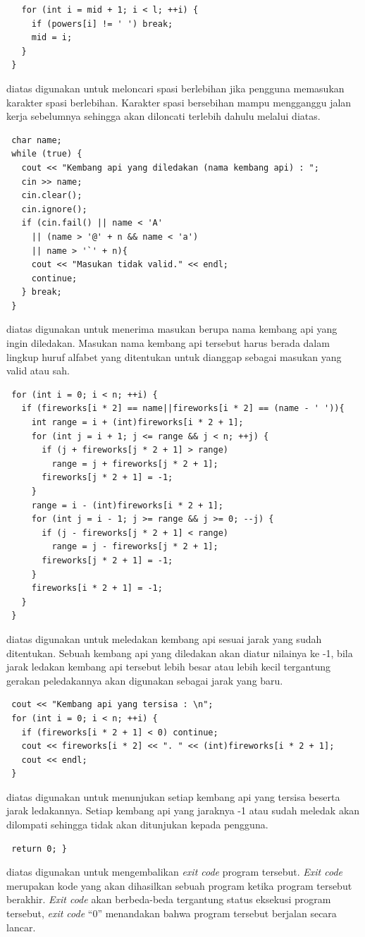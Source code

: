 \documentclass{subfiles}
\begin{document}
\begin{lstlisting}
   for (int i = mid + 1; i < l; ++i) {
     if (powers[i] != ' ') break;
     mid = i;
   }
 }
\end{lstlisting}
\ilz{}{\Script} diatas digunakan untuk meloncari spasi berlebihan jika pengguna memasukan karakter spasi berlebihan. Karakter spasi bersebihan mampu mengganggu jalan kerja {\script} sebelumnya sehingga akan diloncati terlebih dahulu melalui {\script} diatas.

\begin{lstlisting}
 char name;
 while (true) {
   cout << "Kembang api yang diledakan (nama kembang api) : ";
   cin >> name;
   cin.clear();
   cin.ignore();
   if (cin.fail() || name < 'A'
     || (name > '@' + n && name < 'a')
     || name > '`' + n){
     cout << "Masukan tidak valid." << endl;
     continue;
   } break;
 }
\end{lstlisting}
\ilz{}{\Script} diatas digunakan untuk menerima masukan berupa nama kembang api yang ingin diledakan. Masukan nama kembang api tersebut harus berada dalam lingkup huruf alfabet yang ditentukan untuk dianggap sebagai masukan yang valid atau sah.

\begin{lstlisting}
 for (int i = 0; i < n; ++i) {
   if (fireworks[i * 2] == name||fireworks[i * 2] == (name - ' ')){
     int range = i + (int)fireworks[i * 2 + 1];
     for (int j = i + 1; j <= range && j < n; ++j) {
       if (j + fireworks[j * 2 + 1] > range)
         range = j + fireworks[j * 2 + 1];
       fireworks[j * 2 + 1] = -1;
     }
     range = i - (int)fireworks[i * 2 + 1];
     for (int j = i - 1; j >= range && j >= 0; --j) {
       if (j - fireworks[j * 2 + 1] < range)
         range = j - fireworks[j * 2 + 1];
       fireworks[j * 2 + 1] = -1;
     }
     fireworks[i * 2 + 1] = -1;
   }
 }
\end{lstlisting}
\ilz{}{\Script} diatas digunakan untuk meledakan kembang api sesuai jarak yang sudah ditentukan. Sebuah kembang api yang diledakan akan diatur nilainya ke -1, bila jarak ledakan kembang api tersebut lebih besar atau lebih kecil tergantung gerakan peledakannya akan digunakan sebagai jarak yang baru.
\newpage

\begin{lstlisting}
 cout << "Kembang api yang tersisa : \n";
 for (int i = 0; i < n; ++i) {
   if (fireworks[i * 2 + 1] < 0) continue;
   cout << fireworks[i * 2] << ". " << (int)fireworks[i * 2 + 1];
   cout << endl;
 }
\end{lstlisting}
\ilz{}{\Script} diatas digunakan untuk menunjukan setiap kembang api yang tersisa beserta jarak ledakannya. Setiap kembang api yang jaraknya -1 atau sudah meledak akan dilompati sehingga tidak akan ditunjukan kepada pengguna.

\begin{lstlisting}
 return 0; }
\end{lstlisting}
\ilz{}{\Script} diatas digunakan untuk mengembalikan \textit{exit code} program tersebut. \textit{Exit code} merupakan kode yang akan dihasilkan sebuah program ketika program tersebut berakhir. \textit{Exit code} akan berbeda-beda tergantung status eksekusi program tersebut, \textit{exit code} ``0'' menandakan bahwa program tersebut berjalan secara lancar.
\end{document}
